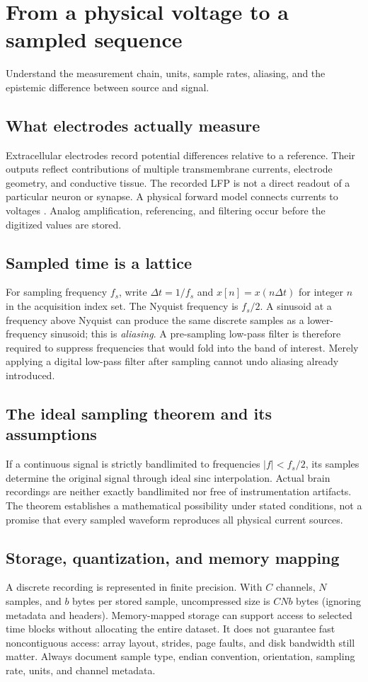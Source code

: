 \chapter{From a physical voltage to a sampled sequence}\label{ch:sampling}
\begin{readergoal}Understand the measurement chain, units, sample rates, aliasing, and the epistemic difference between source and signal.\end{readergoal}
\section{What electrodes actually measure}
Extracellular electrodes record potential differences relative to a reference. Their outputs reflect contributions of multiple transmembrane currents, electrode geometry, and conductive tissue. The recorded LFP is not a direct readout of a particular neuron or synapse. A physical forward model connects currents to voltages \cite{Buzsaki2012,Einevoll2013}. Analog amplification, referencing, and filtering occur before the digitized values are stored.

\section{Sampled time is a lattice}
For sampling frequency $f_s$, write $\Delta t=1/f_s$ and $x[n]=x(n\Delta t)$ for integer $n$ in the acquisition index set. The Nyquist frequency is $f_s/2$. A sinusoid at a frequency above Nyquist can produce the same discrete samples as a lower-frequency sinusoid; this is \emph{aliasing}. A pre-sampling low-pass filter is therefore required to suppress frequencies that would fold into the band of interest. Merely applying a digital low-pass filter after sampling cannot undo aliasing already introduced.

\section{The ideal sampling theorem and its assumptions}
If a continuous signal is strictly bandlimited to frequencies $|f|<f_s/2$, its samples determine the original signal through ideal sinc interpolation. Actual brain recordings are neither exactly bandlimited nor free of instrumentation artifacts. The theorem establishes a mathematical possibility under stated conditions, not a promise that every sampled waveform reproduces all physical current sources.

\section{Storage, quantization, and memory mapping}
A discrete recording is represented in finite precision. With $C$ channels, $N$ samples, and $b$ bytes per stored sample, uncompressed size is $C N b$ bytes (ignoring metadata and headers). Memory-mapped storage can support access to selected time blocks without allocating the entire dataset. It does not guarantee fast noncontiguous access: array layout, strides, page faults, and disk bandwidth still matter. Always document sample type, endian convention, orientation, sampling rate, units, and channel metadata.

